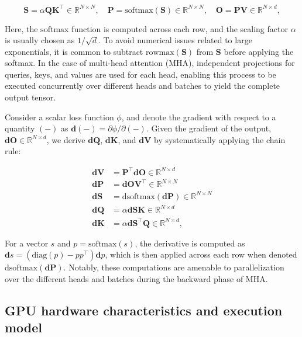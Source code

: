 \begin{equation*}
  \mathbf{S} = \alpha \mathbf{Q} \mathbf{K}^\top \in \mathbb{R}^{N \times N}, \quad \mathbf{P} = \mathrm{softmax}(\mathbf{S}) \in \mathbb{R}^{N \times N}, \quad \mathbf{O} = \mathbf{P}\mathbf{V} \in \mathbb{R}^{N \times d},
\end{equation*}

Here, the $\mathrm{softmax}$ function is computed across each row, and the scaling factor $\alpha$ is usually chosen as $1/\sqrt{d}$. To avoid numerical issues related to large exponentials, it is common to subtract $\mathrm{rowmax}(\mathbf{S})$ from $\mathbf{S}$ before applying the softmax. In the case of multi-head attention (MHA), independent projections for queries, keys, and values are used for each head, enabling this process to be executed concurrently over different heads and batches to yield the complete output tensor.

Consider a scalar loss function $\phi$, and denote the gradient with respect to a quantity $(-)$ as $\mathbf{d}(-) = \partial \phi / \partial (-)$. Given the gradient of the output, $\mathbf{dO} \in \mathbb{R}^{N \times d}$, we derive $\mathbf{dQ}$, $\mathbf{dK}$, and $\mathbf{dV}$ by systematically applying the chain rule:

\begin{align*}
  \mathbf{dV} &= \mathbf{P}^\top \mathbf{dO} \in \mathbb{R}^{N \times d} \\
  \mathbf{dP} &= \mathbf{dO} \mathbf{V}^\top \in \mathbb{R}^{N \times N} \\
  \mathbf{dS} &= \mathrm{dsoftmax} (\mathbf{dP}) \in \mathbb{R}^{N \times N} \\
  \mathbf{dQ} &= \alpha \mathbf{dS} \mathbf{K} \in \mathbb{R}^{N \times d} \\
  \mathbf{dK} &= \alpha \mathbf{dS}^\top \mathbf{Q} \in \mathbb{R}^{N \times d},
\end{align*}

For a vector $s$ and $p = \mathrm{softmax}(s)$, the derivative is computed as $\mathbf{d}s = (\mathrm{diag}(p) - p p^\top)\mathbf{d}p$, which is then applied across each row when denoted $\mathrm{dsoftmax}(\mathbf{dP})$. Notably, these computations are amenable to parallelization over the different heads and batches during the backward phase of MHA.

\subsection{GPU hardware characteristics and execution model}
\label{subsec:hardware}

